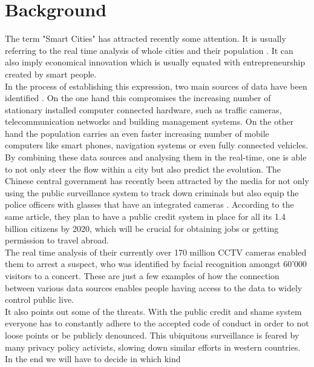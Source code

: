 \documentclass[letterpaper]{article}
\begin{document}
\section{Background}\label{sec:background}
The term "Smart Cities" has attracted recently \cite{Ferdowsi2018,Abu-Matar2018,Usman2018} some attention. It is usually referring 
to the real time analysis of whole cities and their population \cite{smartCities3}. It can also imply economical 
innovation which is usually equated with entrepreneurship created by smart people.\\
\indent In the process of establishing this expression, two main  sources of data have been identified \cite{smartCities3}. 
On the one hand this compromises the increasing number of stationary installed computer connected hardware, such as traffic cameras, 
telecommunication networks and building management systems. On the other hand the population carries an even faster increasing 
number of mobile computers like smart phones, navigation systems or even fully connected vehicles.\\
\indent By combining these data sources and analysing them in the real-time, one is able to not only steer the flow within a city 
but also predict the evolution. The Chinese central government has recently been attracted by the media \cite{thediplomat1} for not only 
using the public surveillance system to track down criminals but also equip the police officers with glasses that have an integrated 
cameras \cite{cnet1}. According to the same article, they plan to have a public credit system in place for all its 1.4 billion citizens 
by 2020, which will be crucial for obtaining jobs or getting permission to travel abroad.\\
\indent The real time analysis of their currently over 170 million CCTV cameras \cite{bbc1} enabled them to arrest a suspect, who was 
identified by facial recognition amongst 60'000 visitors to a concert. These are just a few examples of how the connection between various 
data sources enables people having access to the data to widely control public live.\\ %
\indent It also points out some of the threats. With the public credit and shame system \cite{cnet1} everyone has to constantly 
adhere to the accepted code of conduct in order to not loose points or be publicly denounced. This ubiquitous surveillance is feared 
by many privacy policy activists, slowing down similar efforts in western countries. In the end we will have to decide in which kind 
\end{document}
